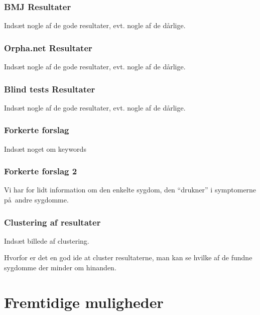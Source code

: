\documentclass[xcolor=table]{beamer}
\begin{document}
\begin{frame}

  \frametitle{BMJ Resultater}

  Inds\ae t nogle af de gode resultater, evt. nogle af de d\aa rlige.

\end{frame}

\begin{frame}

  \frametitle{Orpha.net Resultater}

  Inds\ae t nogle af de gode resultater, evt. nogle af de d\aa rlige.

\end{frame}

\begin{frame}

  \frametitle{Blind tests Resultater}

  Inds\ae t nogle af de gode resultater, evt. nogle af de d\aa rlige.

\end{frame}

\begin{frame}

  \frametitle{Forkerte forslag}

  Inds\ae t noget om keywords

\end{frame}

\begin{frame}

  \frametitle{Forkerte forslag 2}

  Vi har for lidt information om den enkelte sygdom, den ``drukner'' i symptomerne p\aa\ andre sygdomme.

\end{frame}

\begin{frame}

  \frametitle{Clustering af resultater}

  Inds\ae t billede af clustering.

  Hvorfor er det en god ide at cluster resultaterne, man kan se hvilke
  af de fundne sygdomme der minder om hinanden.

\end{frame}

\section{Fremtidige muligheder}
\end{document}
